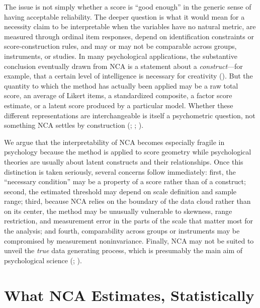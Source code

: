 \documentclass[
  man,
  longtable,
  nolmodern,
  notxfonts,
  notimes,
  colorlinks=true,linkcolor=blue,citecolor=blue,urlcolor=blue]{apa7}
\begin{document}
The issue is not simply whether a score is ``good enough'' in the
generic sense of having acceptable reliability. The deeper question is
what it would mean for a necessity claim to be interpretable when the
variables have no natural metric, are measured through ordinal item
responses, depend on identification constraints or score-construction
rules, and may or may not be comparable across groups, instruments, or
studies. In many psychological applications, the substantive conclusion
eventually drawn from NCA is a statement about a \emph{construct}---for
example, that a certain level of intelligence is necessary for
creativity
(). But the quantity to which the method has actually been
applied may be a raw total score, an average of Likert items, a
standardized composite, a factor score estimate, or a latent score
produced by a particular model. Whether these different representations
are interchangeable is itself a psychometric question, not something NCA
settles by construction
(;
;
).

We argue that the interpretability of NCA becomes especially fragile in
psychology because the method is applied to score geometry while
psychological theories are usually about latent constructs and their
relationships. Once this distinction is taken seriously, several
concerns follow immediately: first, the ``necessary condition'' may be a
property of a score rather than of a construct; second, the estimated
threshold may depend on scale definition and sample range; third,
because NCA relies on the boundary of the data cloud rather than on its
center, the method may be unusually vulnerable to skewness, range
restriction, and measurement error in the parts of the scale that matter
most for the analysis; and fourth, comparability across groups or
instruments may be compromised by measurement noninvariance. Finally,
NCA may not be suited to unveil the \emph{true} data generating process,
which is presumably the main aim of psychological science
(;
).

\section{What NCA Estimates,
Statistically}\label{what-nca-estimates-statistically}
\end{document}
